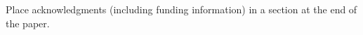 \documentclass[10pt,letterpaper]{article}
\begin{document}
Place acknowledgments (including funding information) in a section at
the end of the paper.






\setlength{\bibleftmargin}{.125in}
\setlength{\bibindent}{-\bibleftmargin}


\end{document}
